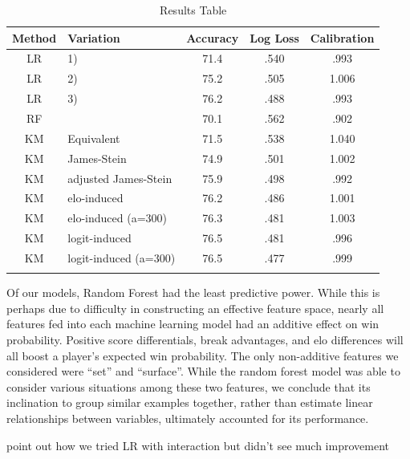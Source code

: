 \documentclass[chapterprefix=false]{report}
\begin{document}
\begin{center}
\begin{table}[H]
        \caption{Results Table}
        \centering
        \begin{tabular}{@{}clccc@{}}
            \toprule
            Method & Variation & Accuracy & Log Loss & Calibration \\\midrule

            LR & 1) & 71.4 & .540 & .993  \\\addlinespace
            
            LR & 2) & 75.2 & .505 & 1.006
  \\\addlinespace
 LR & 3) & 76.2 & .488 & .993
  \\\addlinespace
 RF &  & 70.1 & .562 & .902\\\addlinespace
 KM & Equivalent & 71.5 & .538 & 1.040\\\addlinespace
 KM & James-Stein & 74.9 & .501 & 1.002\\\addlinespace
 KM & adjusted James-Stein & 75.9 & .498 & .992\\\addlinespace
 KM & elo-induced & 76.2 & .486 & 1.001\\\addlinespace
 KM & elo-induced (a=300) & 76.3 & .481 & 1.003\\\addlinespace
 KM & logit-induced & 76.5 & .481 & .996\\\addlinespace
 KM & logit-induced (a=300) & 76.5 & .477 & .999\\\addlinespace
            \bottomrule
        \end{tabular}
    \end{table}
    \end{center}

Of our models, Random Forest had the least predictive power. While this is perhaps due to difficulty in constructing an effective feature space, nearly all features fed into each machine learning model had an additive effect on win probability. Positive score differentials, break advantages, and elo differences will all boost a player's expected win probability. The only non-additive features we considered were ``set'' and ``surface''. While the random forest model was able to consider various situations among these two features, we conclude that its inclination to group similar examples together, rather than estimate linear relationships between variables, ultimately accounted for its performance.

point out how we tried LR with interaction but didn't see much improvement
\end{document}
